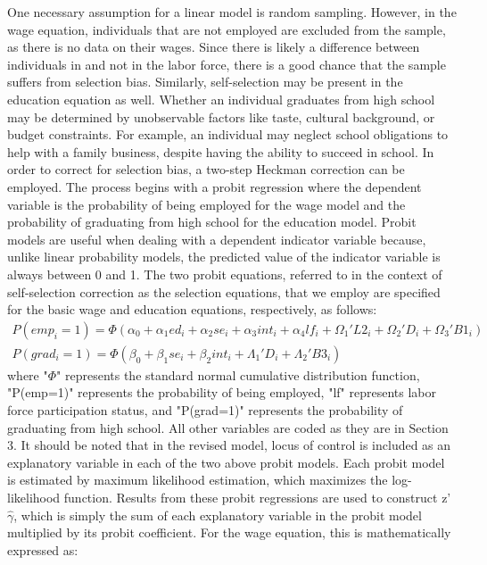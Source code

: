 \documentclass[12pt]{report}
\begin{document}
One necessary assumption for a linear model is random sampling. However, in the wage equation, individuals that are not employed are excluded from the sample, as there is no data on their wages. Since there is likely a difference between individuals in and not in the labor force, there is a good chance that the sample suffers from selection bias. Similarly, self-selection may be present in the education equation as well. Whether an individual graduates from high school may be determined by unobservable factors like taste, cultural background, or budget constraints. For example, an individual may neglect school obligations to help with a family business, despite having the ability to succeed in school. In order to correct for selection bias, a two-step Heckman correction can be employed. The process begins with a probit regression where the dependent variable is the probability of being employed for the wage model and the probability of graduating from high school for the education model. Probit models are useful when dealing with a dependent indicator variable because, unlike linear probability models, the predicted value of the indicator variable is always between 0 and 1. The two probit equations, referred to in the context of self-selection correction as the selection equations, that we employ are specified for the basic wage and education equations, respectively, as follows:
\begin{eqnarray}
P(emp_i = 1) = \Phi (\alpha_0 + \alpha_1 ed_i + \alpha_2 se_i + \alpha_3 int_i + \alpha_4 lf_i +\Omega_1' L2_i + \Omega_2' D_i + \Omega_3' B1_i)\\
P(grad_i = 1) = \Phi (\beta_0 + \beta_1se_i + \beta_2 int_i + \Lambda_1' D_i + \Lambda_2' B3_i)
\end{eqnarray}
where "$\Phi$" represents the standard normal cumulative distribution function, "P(emp=1)" represents the probability of being employed, "lf" represents labor force participation status, and "P(grad=1)" represents the probability of graduating from high school. All other variables are coded as they are in Section 3. It should be noted that in the revised model, locus of control is included as an explanatory variable in each of the two above probit models. Each probit model is estimated by maximum likelihood estimation, which maximizes the log-likelihood function. Results from these probit regressions are used to construct z'$\hat{\gamma}$, which is simply the sum of each explanatory variable in the probit model multiplied by its probit coefficient. For the wage equation, this is mathematically expressed as:
\end{document}
